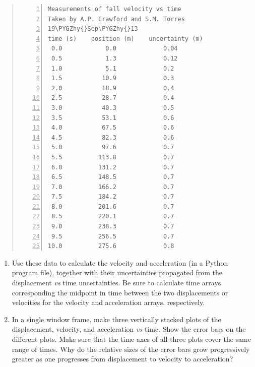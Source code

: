 \documentclass[letterpaper,10pt,english]{sphinxmanual}
\def\PYGZhy{\char`\-}
\begin{document}
\begin{enumerate}
\begin{quote}
\begin{Verbatim}[commandchars=\\\{\},numbers=left,firstnumber=1,stepnumber=1]
Measurements of fall velocity vs time
Taken by A.P. Crawford and S.M. Torres
19\PYGZhy{}Sep\PYGZhy{}13
time (s)    position (m)    uncertainty (m)
 0.0            0.0             0.04
 0.5            1.3             0.12
 1.0            5.1             0.2
 1.5           10.9             0.3
 2.0           18.9             0.4
 2.5           28.7             0.4
 3.0           40.3             0.5
 3.5           53.1             0.6
 4.0           67.5             0.6
 4.5           82.3             0.6
 5.0           97.6             0.7
 5.5          113.8             0.7
 6.0          131.2             0.7
 6.5          148.5             0.7
 7.0          166.2             0.7
 7.5          184.2             0.7
 8.0          201.6             0.7
 8.5          220.1             0.7
 9.0          238.3             0.7
 9.5          256.5             0.7
10.0          275.6             0.8
\end{Verbatim}
\end{quote}
\begin{enumerate}
\item {} 
Use these data to calculate the velocity and acceleration (in a Python program  file), together with their uncertainties propagated from the displacement \emph{vs} time uncertainties.  Be sure to calculate time arrays corresponding the midpoint in time between the two displacements or velocities for the velocity and acceleration arrays, respectively.

\item {} 
In a single window frame, make three vertically stacked plots of the displacement, velocity, and acceleration \emph{vs} time.  Show the error bars on the different plots.  Make sure that the time axes of all three plots cover the same range of times. Why do the relative sizes of the error bars grow progressively greater as one progresses from displacement to velocity to acceleration?

\end{enumerate}

\end{enumerate}
\end{document}
